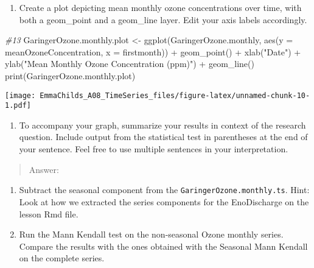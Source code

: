 \documentclass[
]{article}
\newenvironment{Shaded}{\begin{snugshade}}{\end{snugshade}}
\newcommand{\AttributeTok}[1]{\textcolor[rgb]{0.77,0.63,0.00}{#1}}
\newcommand{\CommentTok}[1]{\textcolor[rgb]{0.56,0.35,0.01}{\textit{#1}}}
\newcommand{\FunctionTok}[1]{\textcolor[rgb]{0.00,0.00,0.00}{#1}}
\newcommand{\NormalTok}[1]{#1}
\newcommand{\OtherTok}[1]{\textcolor[rgb]{0.56,0.35,0.01}{#1}}
\newcommand{\SpecialCharTok}[1]{\textcolor[rgb]{0.00,0.00,0.00}{#1}}
\newcommand{\StringTok}[1]{\textcolor[rgb]{0.31,0.60,0.02}{#1}}
\providecommand{\tightlist}{%
  \setlength{\itemsep}{0pt}\setlength{\parskip}{0pt}}
\begin{document}
\begin{enumerate}
\def\labelenumi{\arabic{enumi}.}
\setcounter{enumi}{12}
\tightlist
\item
  Create a plot depicting mean monthly ozone concentrations over time,
  with both a geom\_point and a geom\_line layer. Edit your axis labels
  accordingly.
\end{enumerate}

\begin{Shaded}
\begin{Highlighting}[]
\CommentTok{\#13}
\NormalTok{GaringerOzone.monthly.plot }\OtherTok{\textless{}{-}} \FunctionTok{ggplot}\NormalTok{(GaringerOzone.monthly, }\FunctionTok{aes}\NormalTok{(}\AttributeTok{y =}\NormalTok{ meanOzoneConcentration, }\AttributeTok{x =}\NormalTok{ firstmonth)) }\SpecialCharTok{+}
  \FunctionTok{geom\_point}\NormalTok{() }\SpecialCharTok{+}
  \FunctionTok{xlab}\NormalTok{(}\StringTok{"Date"}\NormalTok{) }\SpecialCharTok{+}
  \FunctionTok{ylab}\NormalTok{(}\StringTok{"Mean Monthly Ozone Concentration (ppm)"}\NormalTok{) }\SpecialCharTok{+}
  \FunctionTok{geom\_line}\NormalTok{()}
\FunctionTok{print}\NormalTok{(GaringerOzone.monthly.plot)}
\end{Highlighting}
\end{Shaded}

\texttt{[image: EmmaChilds\_A08\_TimeSeries\_files/figure-latex/unnamed-chunk-10-1.pdf]}

\begin{enumerate}
\def\labelenumi{\arabic{enumi}.}
\setcounter{enumi}{13}
\tightlist
\item
  To accompany your graph, summarize your results in context of the
  research question. Include output from the statistical test in
  parentheses at the end of your sentence. Feel free to use multiple
  sentences in your interpretation.
\end{enumerate}

\begin{quote}
Answer:
\end{quote}

\begin{enumerate}
\def\labelenumi{\arabic{enumi}.}
\setcounter{enumi}{14}
\item
  Subtract the seasonal component from the
  \texttt{GaringerOzone.monthly.ts}. Hint: Look at how we extracted the
  series components for the EnoDischarge on the lesson Rmd file.
\item
  Run the Mann Kendall test on the non-seasonal Ozone monthly series.
  Compare the results with the ones obtained with the Seasonal Mann
  Kendall on the complete series.
\end{enumerate}
\end{document}
